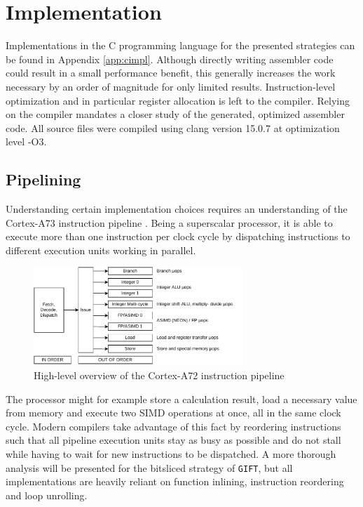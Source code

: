\chapter{Implementation}

Implementations in the C programming language for the presented strategies can
be found in Appendix \ref{app:cimpl}. Although directly writing assembler code
could result in a small performance benefit, this generally increases the work
necessary by an order of magnitude for only limited results. Instruction-level
optimization and in particular register allocation is left to the compiler.
Relying on the compiler mandates a closer study of the generated, optimized
assembler code. All source files were compiled using clang version 15.0.7 at
optimization level -O3.

\section{Pipelining}

Understanding certain implementation choices requires an understanding of the
Cortex-A73 instruction pipeline \cite{a72opt:2015}. Being a superscalar
processor, it is able to execute more than one instruction per clock cycle by
dispatching instructions to different execution units working in parallel.

\begin{figure}[h!]
    \centering
    \includegraphics[width=0.7\textwidth]{Figures/a72pipeline.pdf}
    \caption{High-level overview of the Cortex-A72 instruction pipeline}
    \label{fig:pipelining}
\end{figure}

The processor might for example store a calculation result, load a necessary
value from memory and execute two SIMD operations at once, all in the same
clock cycle. Modern compilers take advantage of this fact by reordering
instructions such that all pipeline execution units stay as busy as possible
and do not stall while having to wait for new instructions to be dispatched. A
more thorough analysis will be presented for the bitsliced strategy of
\texttt{GIFT}, but all implementations are heavily reliant on function
inlining, instruction reordering and loop unrolling.

